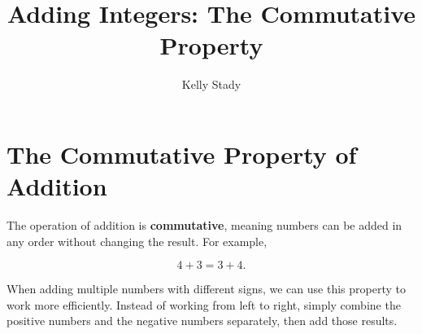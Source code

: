 \documentclass{ximera}[font=12pt]
\title{Adding Integers: The Commutative Property}   %
\author{Kelly Stady}
\begin{document}
\begin{abstract}

\end{abstract}

\maketitle
\label{xim:AddIntCommPropActivity}


\section*{The Commutative Property of Addition}

The operation of addition is \textbf{commutative}, meaning numbers can be added in any order without changing 
the result.  For example,

\[ 4 + 3 = 3 + 4. \]

When adding multiple numbers with different signs, we can use this property to work more efficiently.  Instead of 
working from left to right, simply combine the positive numbers and the negative numbers separately, then add 
those results.
\end{document}
